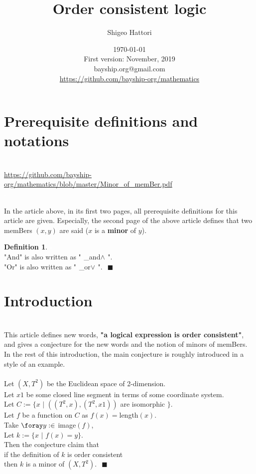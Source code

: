 \newqed\documentclass{article}
\title{Order consistent logic}
\author{Shigeo Hattori}
\date{\today
\\{\small First version: November, 2019}
\\{\small bayship.org@gmail.com}
\\{\small \url{https://github.com/bayship-org/mathematics}}
}
\theoremstyle{definition}
\newtheorem{definition}{Definition}[section]
\newcommand{\newspc}{\textcolor{white}{s}}
\newcommand{\newqed}{\newspc{\hfill\color{ocre}\ensuremath{\blacksquare}}}
\newcommand{\newland}{\newspc_{and}$\land$\newspc}
\newcommand{\newvee}{\newspc_{or}$\vee$\newspc}
\begin{document}
\maketitle
\section{Prerequisite definitions and notations }
\\\url{https://github.com/bayship-org/mathematics/blob/master/Minor_of_memBer.pdf}
\\\newspc
\begin{itemize}
\end{itemize}
\linenumbers
In the article above, in its first two pages, all prerequisite definitions for this article are given. Especially, the second page of the above article defines that two memBers $(x,y)$ are said ($x$ is a \textbf{minor} of $y$).


\begin{definition}
\newspc\\"And" is also written as "\newland".
\\"Or" is also written as "\newvee".
\newqed

\end{definition}

\section{Introduction}
\\This article defines new words, \textbf{"a logical expression is order consistent"}, and gives a conjecture for the new words and the notion of minors of memBers. In the rest of this introduction, the main conjecture is roughly introduced in a style of an example.
\\\newspc
\\Let $(X,T^2)$ be the Euclidean space of 2-dimension.
\\Let $x1$ be some closed line segment in terms of some coordinate system.
\\Let $C:=\{x$ $|$ $((T^2,x),(T^2,x1))$ are isomorphic $\}$.
\\Let $f$ be a function on $C$ as $f(x)=$length$(x)$.
\\Take $\foray y:\in$ image$(f)$,
\\Let $k:=\{x$ $|$ $f(x)=y\}$.
\\Then the conjecture claim that
\\if the definition of $k$ is order consistent
\\then $k$ is a minor of $(X,T^2)$.
\newqed
\end{document}
